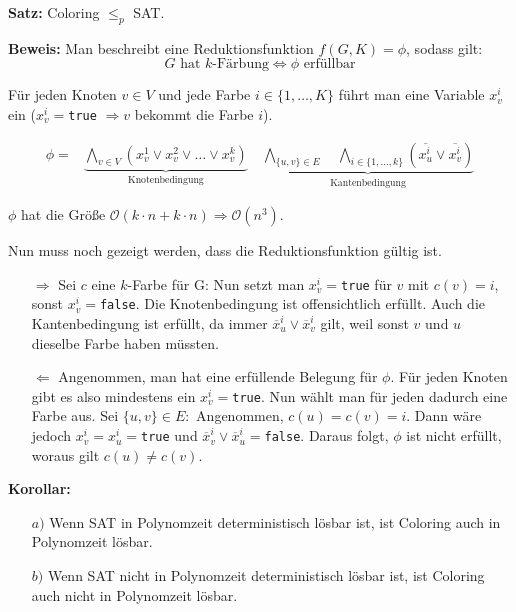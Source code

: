 \documentclass{scrartcl}%
\begin{document}
    \vspace*{0.3cm}
    \textbf{\textsf{Satz:}} Coloring $\leq_p$ SAT.

    \vspace*{0.3cm}
    \textbf{\textsf{Beweis:}} Man beschreibt eine Reduktionsfunktion $f(G,K) = \phi$, sodass gilt:
    \begin{equation*}
        G \text{ hat } k\text{-Färbung} \Leftrightarrow \phi \text{ erfüllbar}
    \end{equation*}

    Für jeden Knoten $v \in V$ und jede Farbe $i \in \{1, \dots, K\}$ führt man eine Variable $x_v^i$ ein \newline
    ($x_v^i =$\texttt{true} $\Rightarrow v$ bekommt die Farbe $i$).

    \begin{align*}
        \phi = & \underbrace{\bigwedge_{v \in V}(x_v^1 \lor x_v^2 \lor \dots \lor x_v^k)}_{\text{Knotenbedingung}} \quad
         \underbrace{\bigwedge_{\{u,v\} \in E}\quad \bigwedge_{i \in \{1, \dots, k\}} (\overline{x_u^i} \lor \overline{x_v^i})}_{\text{Kantenbedingung}}
    \end{align*}

    $\phi$ hat die Größe $\mathcal{O}(k \cdot n + k \cdot n) \Rightarrow \mathcal{O}(n^3)$.

    \vspace*{0.3cm}
    Nun muss noch gezeigt werden, dass die Reduktionsfunktion gültig ist.
    \begin{itemize}
        \item [$\Rightarrow$] Sei $c$ eine $k$-Farbe für G: Nun setzt man $x_v^i =$\texttt{true} für $v$ mit $c(v)=i$, sonst $x_v^{i}=$\texttt{false}.
        Die Knotenbedingung ist offensichtlich erfüllt. Auch die Kantenbedingung ist erfüllt, da immer $\overline{x}_u^i \lor \overline{x}_v^i$ gilt,
        weil sonst $v$ und $u$ dieselbe Farbe haben müssten.
        \item [$\Leftarrow$] Angenommen, man hat eine erfüllende Belegung für $\phi$. Für jeden Knoten gibt es also mindestens ein $x_v^{i}=$\texttt{true}.
        Nun wählt man für jeden dadurch eine Farbe aus. Sei $\{u,v\} \in E:$ Angenommen, $c(u)=c(v)=i$.
        Dann wäre jedoch $x_v^i = x_u^i =$\texttt{true} und $\overline{x}_v^i \lor \overline{x}_u^{i}=$\texttt{false}. Daraus folgt, $\phi$ ist nicht erfüllt, woraus gilt $c(u) \neq c(v)$.\proofend
    \end{itemize}

    \vspace*{0.3cm}
    \textbf{\textsf{Korollar:}}
    \begin{itemize}
        \item [$a)$] Wenn SAT in Polynomzeit deterministisch lösbar ist, ist Coloring auch in Polynomzeit lösbar.
        \item [$b)$] Wenn SAT nicht in Polynomzeit deterministisch lösbar ist, ist Coloring auch nicht in Polynomzeit lösbar.
    \end{itemize}
\end{document}
